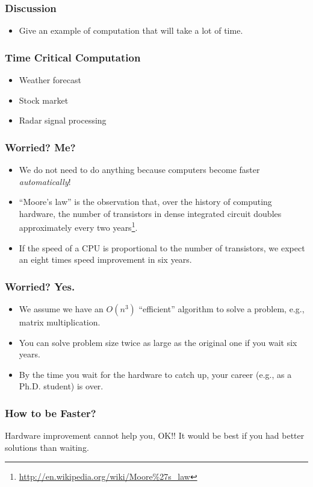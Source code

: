 \documentclass{beamer}
\begin{document}
\begin{CJK}{UTF8}{bsmi}
\begin{frame}
\frametitle{Discussion} \Large 
\begin{itemize}
\item Give an example of computation that will take a lot of time.
\end{itemize}
\end{frame}

\begin{frame}
\frametitle{Time Critical Computation}
\begin{itemize}
\item Weather forecast
\item Stock market
\item Radar signal processing
\end{itemize}
\end{frame}

\begin{frame}
\frametitle{Worried? Me?}
\begin{itemize}
\item We do not need to do anything because computers become faster
  {\em automatically}!
\item ``Moore's law'' is the observation that, over the history of computing hardware, the number of transistors in dense integrated circuit doubles approximately every two years\footnote{\url{http://en.wikipedia.org/wiki/Moore\%27s_law}}.
\item If the speed of a CPU is proportional to the number of transistors, we expect an eight times speed improvement in six years.
\end{itemize}
\end{frame}

\begin{frame}
\frametitle{Worried? Yes.}
\begin{itemize}
\item We assume we have an $O(n^3)$ ``efficient'' algorithm to solve a
  problem, e.g., matrix multiplication.
\item You can solve problem size twice as large as the original one if
  you wait six years.
\item By the time you wait for the hardware to catch up, your career
  (e.g., as a Ph.D. student) is over.
\end{itemize}
\end{frame}

\begin{frame}
\frametitle{How to be Faster?}  \Huge Hardware improvement cannot help
you, OK!! It would be best if you had better solutions than waiting.
\end{frame}


\end{CJK}
\end{document}
